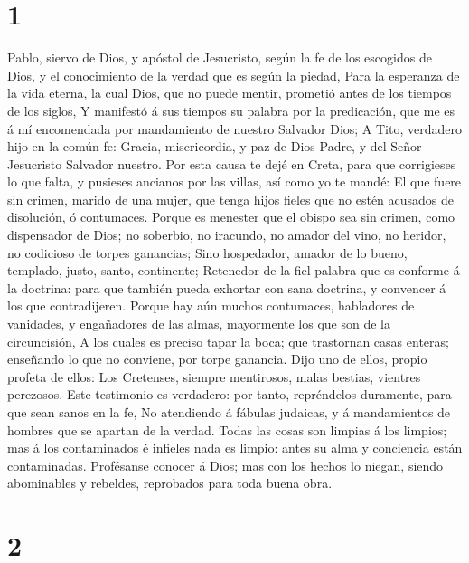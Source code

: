 \hypertarget{section}{%
\section{1}\label{section}}

 Pablo, siervo de Dios, y apóstol de Jesucristo, según la
fe de los escogidos de Dios, y el conocimiento de la verdad que es según
la piedad,  Para la esperanza de la vida eterna, la cual
Dios, que no puede mentir, prometió antes de los tiempos de los siglos,
 Y manifestó á sus tiempos su palabra por la predicación,
que me es á mí encomendada por mandamiento de nuestro Salvador Dios;
 A Tito, verdadero hijo en la común fe: Gracia,
misericordia, y paz de Dios Padre, y del Señor Jesucristo Salvador
nuestro.  Por esta causa te dejé en Creta, para que
corrigieses lo que falta, y pusieses ancianos por las villas, así como
yo te mandé:  El que fuere sin crimen, marido de una
mujer, que tenga hijos fieles que no estén acusados de disolución, ó
contumaces.  Porque es menester que el obispo sea sin
crimen, como dispensador de Dios; no soberbio, no iracundo, no amador
del vino, no heridor, no codicioso de torpes ganancias; 
Sino hospedador, amador de lo bueno, templado, justo, santo, continente;
 Retenedor de la fiel palabra que es conforme á la
doctrina: para que también pueda exhortar con sana doctrina, y convencer
á los que contradijeren.  Porque hay aún muchos
contumaces, habladores de vanidades, y engañadores de las almas,
mayormente los que son de la circuncisión,  A los cuales
es preciso tapar la boca; que trastornan casas enteras; enseñando lo que
no conviene, por torpe ganancia.  Dijo uno de ellos,
propio profeta de ellos: Los Cretenses, siempre mentirosos, malas
bestias, vientres perezosos.  Este testimonio es
verdadero: por tanto, repréndelos duramente, para que sean sanos en la
fe,  No atendiendo á fábulas judaicas, y á mandamientos
de hombres que se apartan de la verdad.  Todas las cosas
son limpias á los limpios; mas á los contaminados é infieles nada es
limpio: antes su alma y conciencia están contaminadas. 
Profésanse conocer á Dios; mas con los hechos lo niegan, siendo
abominables y rebeldes, reprobados para toda buena obra.

\hypertarget{section-1}{%
\section{2}\label{section-1}}

